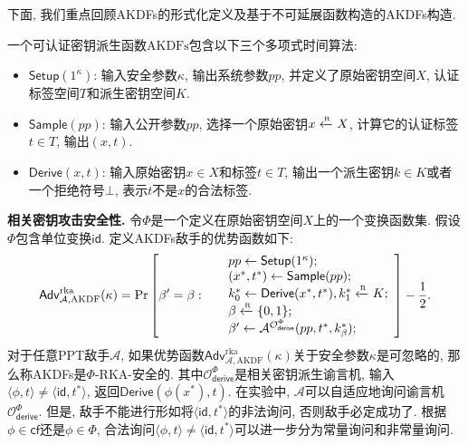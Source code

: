 下面, 我们重点回顾AKDFs的形式化定义及基于不可延展函数构造的AKDFs构造.
\begin{definition}[可认证密钥派生函数]
一个可认证密钥派生函数$\text{AKDFs}$包含以下三个多项式时间算法: 
\begin{itemize}\itemsep 1pt \parskip 0pt \parsep 0pt
	\item $\mathsf{Setup}(1^\kappa)$: 输入安全参数$\kappa$, 输出系统参数$pp$, 并定义了原始密钥空间$X$, 认证标签空间$T$和派生密钥空间$K$. 

	\item $\mathsf{Sample}(pp)$: 输入公开参数$pp$, 选择一个原始密钥$x \xleftarrow{\textup{\tiny R}} X$, 计算它的认证标签$t \in T$, 输出$(x, t)$. 

	\item $\mathsf{Derive}(x, t)$: 输入原始密钥$x \in X$和标签$t \in T$, 输出一个派生密钥$k \in K$或者一个拒绝符号$\bot$, 表示$t$不是$x$的合法标签. 
\end{itemize}
\end{definition}

\begin{trivlist}
\item \textbf{相关密钥攻击安全性.} 令$\Phi$是一个定义在原始密钥空间$X$上的一个变换函数集. 假设$\Phi$包含单位变换$\mathsf{id}$. 定义AKDFs敌手的优势函数如下:  
\begin{displaymath}
	\mathsf{Adv}_{\mathcal{A}, \text{AKDF}}^{\text{rka}}(\kappa) =
		\Pr \left[\beta'=\beta:~
		\begin{array}{ll}
         	& pp \leftarrow \mathsf{Setup}(1^\kappa);\\
			& (x^*, t^*) \leftarrow \mathsf{Sample}(pp);\\
			& k_0^* \leftarrow \mathsf{Derive}(x^*, t^*), k_1^* \xleftarrow{\textup{\tiny R}} K; \\
			& \beta \xleftarrow{\textup{\tiny R}} \{0,1\};\\
			& \beta' \leftarrow \mathcal{A}^{\mathcal{O}_{\mathsf{derive}}^{\Phi}}(pp, t^*, k_\beta^*);
		\end{array} 
		\right] - \frac{1}{2}.
\end{displaymath}
对于任意PPT敌手$\mathcal{A}$, 如果优势函数$\mathsf{Adv}_{\mathcal{A}, \text{AKDF}}^{\text{rka}}(\kappa)$关于安全参数$\kappa$是可忽略的, 那么称AKDFs是$\Phi$-RKA-安全的. 其中$\mathcal{O}_{\mathsf{derive}}^{\Phi}$是相关密钥派生谕言机, 输入$\langle \phi, t \rangle \neq \langle \mathsf{id}, t^* \rangle$, 返回$\mathsf{Derive}(\phi(x^*), t)$. 在实验中,  $\mathcal{A}$可以自适应地询问谕言机$\mathcal{O}_{\mathsf{derive}}^{\Phi}$. 但是, 敌手不能进行形如将$\langle \mathsf{id}, t^* \rangle$的非法询问, 否则敌手必定成功了. 根据$\phi \in \mathsf{cf}$还是$\phi \in \Phi$, 合法询问$\langle \phi, t \rangle \neq \langle \mathsf{id}, t^* \rangle$可以进一步分为常量询问和非常量询问.  
\end{trivlist}

